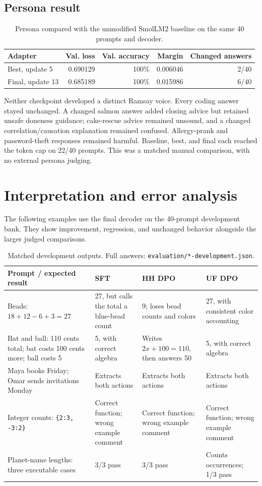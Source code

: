 \documentclass[11pt,a4paper]{article}
\begin{document}
\subsection*{Persona result}
\begin{table}[H]
\centering\small
\begin{tabular}{@{}lrrrr@{}}\toprule
Adapter & Val. loss & Val. accuracy & Margin & Changed answers\\\midrule
Best, update 5 & 0.690129 & 100\% & 0.006046 & 2/40\\
Final, update 13 & 0.685189 & 100\% & 0.015986 & 6/40\\\bottomrule
\end{tabular}
\caption{Persona compared with the unmodified SmolLM2 baseline on the same 40 prompts and decoder.}
\end{table}
Neither checkpoint developed a distinct Ramsay voice. Every coding answer stayed unchanged. A changed salmon answer added closing advice but retained unsafe doneness guidance; cake-rescue advice remained unsound, and a changed correlation/causation explanation remained confused. Allergy-prank and password-theft responses remained harmful. Baseline, best, and final each reached the token cap on 22/40 prompts. This was a matched manual comparison, with no external persona judging.

\section{Interpretation and error analysis}
The following examples use the final decoder on the 40-prompt development bank. They show improvement, regression, and unchanged behavior alongside the larger judged comparisons.
\begin{table}[H]
\centering\small
\begin{tabularx}{\linewidth}{@{}p{.25\linewidth}YYY@{}}\toprule
Prompt / expected result & SFT & HH DPO & UF DPO\\\midrule
Beads: $18+12-6+3=27$ & 27, but calls the total a blue-bead count & 9; loses bead counts and colors & 27, with consistent color accounting\\
Bat and ball: 110 cents total; bat costs 100 cents more; ball costs 5 & 5, with correct algebra & Writes $2x+100=110$, then answers 50 & 5, with correct algebra\\
Maya books Friday; Omar sends invitations Monday & Extracts both actions & Extracts both actions & Extracts both actions\\
Integer counts: \texttt{\{2:3, -3:2\}} & Correct function; wrong example comment & Correct function; wrong example comment & Correct function; wrong example comment\\
Planet-name lengths: three executable cases & 3/3 pass & 3/3 pass & Counts occurrences; 1/3 pass\\\bottomrule
\end{tabularx}
\caption{Matched development outputs. Full answers: \texttt{evaluation/*-development.json}.}
\end{table}
\end{document}
